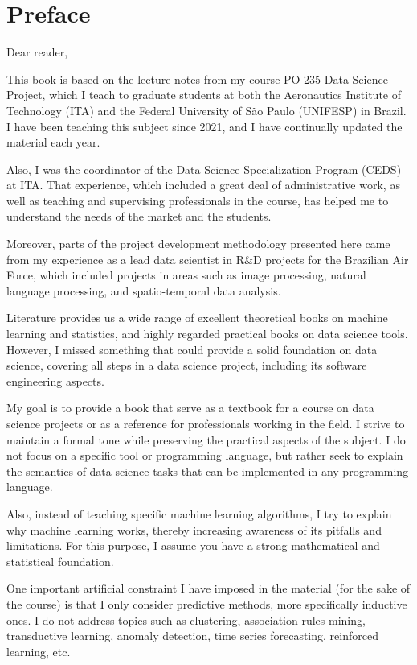 \chapter{Preface}

\noindent Dear reader, \vspace{1em}

This book is based on the lecture notes from my course PO-235 Data Science Project, which
I teach to graduate students at both the Aeronautics Institute of Technology (ITA) and the
Federal University of São Paulo (UNIFESP) in Brazil.  I have been teaching this subject
since 2021, and I have continually updated the material each year.

Also, I was the coordinator of the Data Science Specialization Program (CEDS) at ITA.
That experience, which included a great deal of administrative work, as well as teaching and
supervising professionals in the course, has helped me to understand the needs of the
market and the students.

Moreover, parts of the project development methodology presented here came from my
experience as a lead data scientist in R\&D projects for the Brazilian Air Force,
which included projects in areas such as image processing, natural language processing,
and spatio-temporal data analysis.

Literature provides us a wide range of excellent theoretical books on machine learning and
statistics, and highly regarded practical books on data science tools.  However, I missed
something that could provide a solid foundation on data science, covering all steps in a
data science project, including its software engineering aspects.

My goal is to provide a book that serve as a textbook for a course on data science
projects or as a reference for professionals working in the field.  I strive to maintain a
formal tone while preserving the practical aspects of the subject.  I do not focus on
a specific tool or programming language, but rather seek to explain the semantics of data
science tasks that can be implemented in any programming language.

Also, instead of teaching specific machine learning algorithms, I try to explain why
machine learning works, thereby increasing awareness of its pitfalls and limitations.
For this purpose, I assume you have a strong mathematical and statistical foundation.

One important artificial constraint I have imposed in the material (for the sake of the
course) is that I only consider predictive methods, more specifically inductive ones. I do
not address topics such as clustering, association rules mining, transductive learning,
anomaly detection, time series forecasting, reinforced learning, etc.

